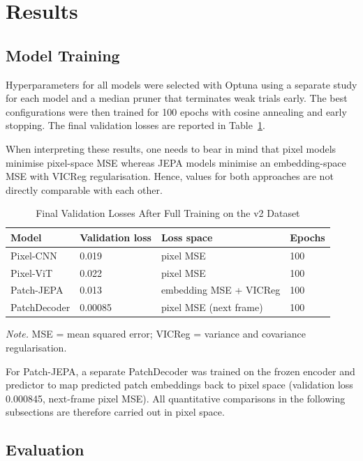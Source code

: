 \FloatBarrier
\section{Results}

\subsection {Model Training}

Hyperparameters for all models were selected with Optuna using a separate study for each model and a median pruner that terminates weak trials early.
The best configurations were then trained for 100 epochs with cosine annealing and early stopping.
The final validation losses are reported in Table~\ref{tab:training}.

When interpreting these results, one needs to bear in mind that pixel models minimise pixel-space MSE whereas JEPA models minimise an embedding-space MSE with VICReg regularisation.
Hence, values for both approaches are not directly comparable with each other.

\begin{table}[h]
\caption{Final Validation Losses After Full Training on the v2 Dataset}
\label{tab:training}
\begin{tabular}{llll}
\toprule
Model & Validation loss & Loss space & Epochs \\
\midrule
Pixel-CNN & 0.019 & pixel MSE & 100 \\
Pixel-ViT & 0.022 & pixel MSE & 100 \\
Patch-JEPA & 0.013 & embedding MSE + VICReg & 100 \\
PatchDecoder & 0.00085 & pixel MSE (next frame) & 100 \\
\bottomrule
\end{tabular}

\smallskip
\raggedright\small\textit{Note.} MSE = mean squared error; VICReg = variance and covariance regularisation.
\end{table}


For Patch-JEPA, a separate PatchDecoder was trained on the frozen encoder and predictor to map predicted patch embeddings back to pixel space (validation loss 0.000845, next-frame pixel MSE).
All quantitative comparisons in the following subsections are therefore carried out in pixel space.

\subsection {Evaluation}

